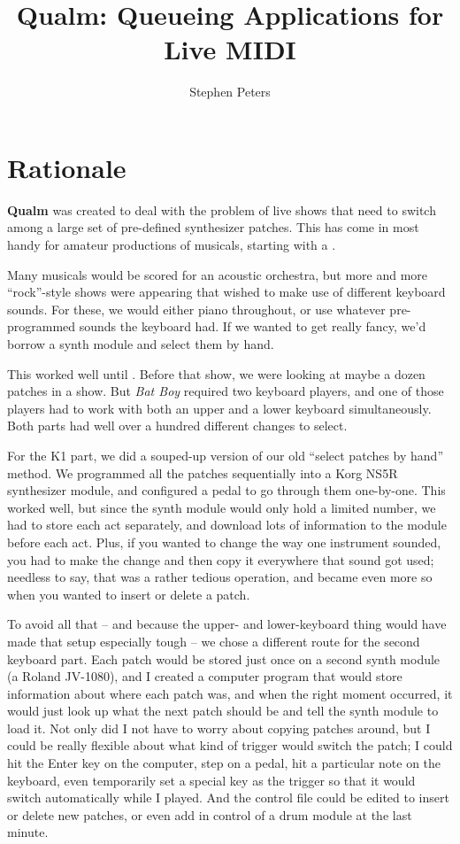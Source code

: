 \documentclass{article}
\newcommand{\q}{{\textsf{\textbf{Qualm}}}\xspace}
\begin{document}
\title{\q: Queueing Applications for Live MIDI}
\author{Stephen Peters}
\maketitle

\section{Rationale}

\q was created to deal with the problem of live shows that need to
switch among a large set of pre-defined synthesizer patches.  This has
come in most handy for amateur productions of musicals, starting with
a .

Many musicals would be scored for an acoustic orchestra, but more and
more ``rock''-style shows were appearing that wished to make use of
different keyboard sounds.  For these, we would either piano
throughout, or use whatever pre-programmed sounds the keyboard had.
If we wanted to get really fancy, we'd borrow a synth module and
select them by hand.

This worked well until .  Before
that show, we were looking at maybe a dozen patches in a show.  But
{\em Bat Boy} required two keyboard players, and one of those players
had to work with both an upper and a lower keyboard simultaneously.
Both parts had well over a hundred different changes to select.

For the K1 part, we did a souped-up version of our old ``select
patches by hand'' method.  We programmed all the patches sequentially
into a Korg NS5R synthesizer module, and configured a pedal to go
through them one-by-one.  This worked well, but since the synth module
would only hold a limited number, we had to store each act separately,
and download lots of information to the module before each act.  Plus,
if you wanted to change the way one instrument sounded, you had to
make the change and then copy it everywhere that sound got used;
needless to say, that was a rather tedious operation, and became even
more so when you wanted to insert or delete a patch.

To avoid all that -- and because the upper- and lower-keyboard thing
would have made that setup especially tough -- we chose a different
route for the second keyboard part.  Each patch would be stored just
once on a second synth module (a Roland JV-1080), and I created a
computer program that would store information about where each patch
was, and when the right moment occurred, it would just look up what
the next patch should be and tell the synth module to load it.  Not
only did I not have to worry about copying patches around, but I could
be really flexible about what kind of trigger would switch the patch;
I could hit the Enter key on the computer, step on a pedal, hit a
particular note on the keyboard, even temporarily set a special key as
the trigger so that it would switch automatically while I played.  And
the control file could be edited to insert or delete new patches, or
even add in control of a drum module at the last minute.
\end{document}
